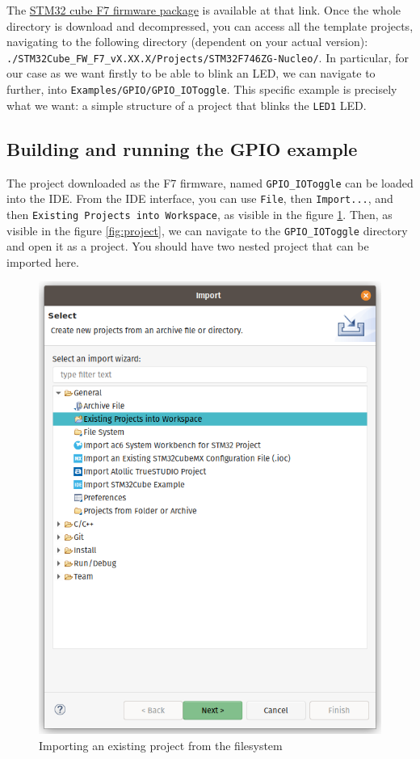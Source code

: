 \documentclass[10pt]{article}
\begin{document}
The \href{https://www.st.com/content/st_com/en/products/embedded-software/mcu-mpu-embedded-software/stm32-embedded-software/stm32cube-mcu-mpu-packages/stm32cubef7.html}{STM32 cube F7 firmware package} is available at that link. Once the whole directory is download and decompressed, you can access all the template projects, navigating to the following directory (dependent on your actual version): \verb|./STM32Cube_FW_F7_vX.XX.X/Projects/STM32F746ZG-Nucleo/|. In particular, for our case as we want firstly to be able to blink an LED, we can navigate to further, into \verb|Examples/GPIO/GPIO_IOToggle|. This specific example is precisely what we want: a simple structure of a project that blinks the \verb|LED1| LED.

\subsection{Building and running the GPIO example}
\label{sec:build-runn-gpio}
The project downloaded as the F7 firmware, named \verb|GPIO_IOToggle| can be loaded into the IDE.
From the IDE interface, you can use \verb|File|, then \verb|Import...|, and then \verb|Existing Projects into Workspace|, as visible in the figure \ref{fig:import}. Then, as visible in the figure \ref{fig:project}, we can navigate to the \verb|GPIO_IOToggle| directory and open it as a project. You should have two nested project that can be imported here.

\begin{figure}[h]
  \centering
  \includegraphics[width=.5\textwidth]{./img/import.png}
  \caption{Importing an existing project from the filesystem}
  \label{fig:import}
\end{figure}
\end{document}
